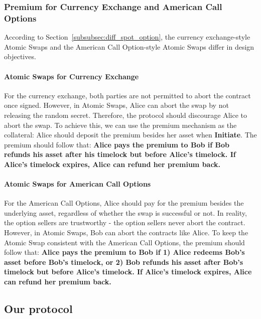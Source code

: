 \subsubsection{Premium for Currency Exchange and American Call Options}
\label{subsubsec:design_obj}

According to Section~\ref{subsubsec:diff_spot_option}, the currency exchange-style Atomic Swaps and the American Call Option-style Atomic Swaps differ in design objectives.

\paragraph{Atomic Swaps for Currency Exchange}
For the currency exchange, both parties are not permitted to abort the contract once signed.
However, in Atomic Swaps, Alice can abort the swap by not releasing the random secret.
Therefore, the protocol should discourage Alice to abort the swap.
To achieve this, we can use the premium mechanism as the collateral: Alice should deposit the premium besides her asset when \textbf{Initiate}.
The premium should follow that:
\textbf{Alice pays the premium to Bob if Bob refunds his asset after his timelock but before Alice's timelock.
If Alice's timelock expires, Alice can refund her premium back.}

\paragraph{Atomic Swaps for American Call Options}
For the American Call Options, Alice should pay for the premium besides the underlying asset, regardless of whether the swap is successful or not.
In reality, the option sellers are trustworthy - the option sellers never abort the contract.
However, in Atomic Swaps, Bob can abort the contracts like Alice.
To keep the Atomic Swap consistent with the American Call Options,
the premium should follow that: 
\textbf{Alice pays the premium to Bob if
1) Alice redeems Bob's asset before Bob's timelock, or
2) Bob refunds his asset after Bob's timelock but before Alice's timelock.
If Alice's timelock expires, Alice can refund her premium back.}











\subsection{Our protocol}


